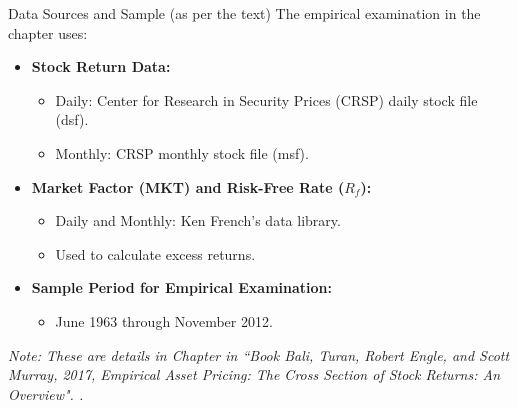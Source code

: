 \documentclass[10pt]{beamer}
\begin{document}
\begin{frame}{Data Sources and Sample (as per the text)}
  The empirical examination in the chapter uses:
  \begin{itemize}
    \item \textbf{Stock Return Data:}
    \begin{itemize}
        \item Daily: Center for Research in Security Prices (CRSP) daily stock file (dsf).
        \item Monthly: CRSP monthly stock file (msf).
    \end{itemize}
    \item \textbf{Market Factor (MKT) and Risk-Free Rate ($R_f$):}
    \begin{itemize}
        \item Daily and Monthly: Ken French's data library.
        \item Used to calculate excess returns.
    \end{itemize}
    \item \textbf{Sample Period for Empirical Examination:}
    \begin{itemize}
        \item June 1963 through November 2012.
    \end{itemize}
  \end{itemize}
  \textit{Note: These are details in Chapter in ``Book Bali, Turan, Robert Engle, and Scott Murray, 2017, Empirical Asset Pricing: The Cross Section of Stock Returns: An Overview".
.}
\end{frame}
\end{document}
